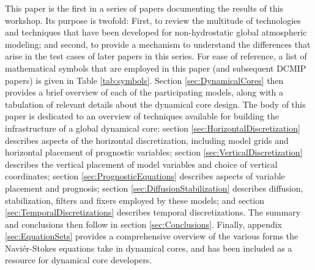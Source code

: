 \documentclass[gmd, manuscript]{copernicus}
\begin{document}
This paper is the first in a series of papers documenting the results of this workshop.  Its purpose is twofold:  First, to review the multitude of technologies and techniques that have been developed for non-hydrostatic global atmospheric modeling; and second, to provide a mechanism to understand the differences that arise in the test cases of later papers in this series.  For ease of reference, a list of mathematical symbols that are employed in this paper (and subsequent DCMIP papers) is given in Table \ref{tab:symbols}.  Section \ref{sec:DynamicalCores} then provides a brief overview of each of the participating models, along with a tabulation of relevant details about the dynamical core design.  The body of this paper is dedicated to an overview of techniques available for building the infrastructure of a global dynamical core:  section \ref{sec:HorizontalDiscretization} describes aspects of the horizontal discretization, including model grids and horizontal placement of prognostic variables; section \ref{sec:VerticalDiscretization} describes the vertical placement of model variables and choice of vertical coordinates; section \ref{sec:PrognosticEquations} describes aspects of variable placement and prognosis; section \ref{sec:DiffusionStabilization} describes diffusion, stabilization, filters and fixers employed by these models; and section \ref{sec:TemporalDiscretizations} describes temporal discretizations.  The summary and conclusions then follow in section \ref{sec:Conclusions}.  Finally, appendix \ref{sec:EquationSets} provides a comprehensive overview of the various forms the Navi\'er-Stokes equations take in dynamical cores, and has been included as a resource for dynamical core developers.
\end{document}
